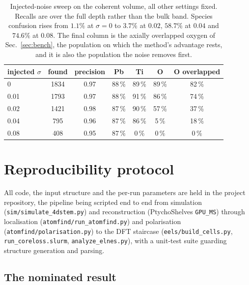 \documentclass[aps,prb,twocolumn,superscriptaddress,floatfix,nofootinbib]{revtex4-2}
\begin{document}
\begin{table}[t]
  \centering \small
  \begin{tabular}{@{}lcccccc@{}}
    \toprule
    injected $\sigma$ & found & precision & Pb & Ti & O & O overlapped \\
    \midrule
    0                 & 1834 & 0.97 & 88\,\% & 89\,\% & 89\,\% & 82\,\% \\
    0.01              & 1793 & 0.97 & 88\,\% & 91\,\% & 86\,\% & 74\,\% \\
    0.02              & 1421 & 0.98 & 87\,\% & 90\,\% & 57\,\% & 37\,\% \\
    0.04              & \phantom{0}795 & 0.96 & 87\,\% & 86\,\% & \phantom{0}5\,\% & 18\,\% \\
    0.08              & \phantom{0}408 & 0.95 & 87\,\% & \phantom{0}0\,\% & \phantom{0}0\,\% & \phantom{0}0\,\% \\
    \bottomrule
  \end{tabular}
  \caption{Injected-noise sweep on the coherent volume, all other settings fixed. Recalls are
    over the full depth rather than the bulk band. Species confusion rises from $1.1\%$ at
    $\sigma=0$ to $3.7\%$ at $0.02$, $58.7\%$ at $0.04$ and $74.6\%$ at $0.08$. The final column
    is the axially overlapped oxygen of Sec.~\ref{sec:bench}, the population on which the
    method's advantage rests, and it is also the population the noise removes first.}
  \label{tab:noise}
\end{table}

\section{Reproducibility protocol}
\label{app:repro}
\setcounter{table}{0}
\setcounter{figure}{0}

All code, the input structure and the per-run parameters are held in the project repository, the
pipeline being scripted end to end from simulation (\texttt{sim/simulate\_4dstem.py}) and
reconstruction (PtychoShelves \texttt{GPU\_MS}) through localisation
(\texttt{atomfind/run\_atomfind.py}) and polarisation (\texttt{atomfind/polarisation.py}) to the
DFT staircase (\texttt{eels/build\_cells.py}, \texttt{run\_coreloss.slurm},
\texttt{analyze\_elnes.py}), with a unit-test suite guarding structure generation and parsing.

\subsection{The nominated result}
\end{document}
